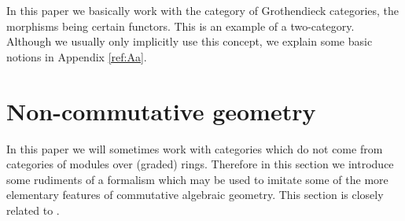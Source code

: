 \documentclass{amsproc}
\theoremstyle{definition}
\theoremstyle{remark}
\numberwithin{equation}{section}
\numberwithin{table}{section}
\numberwithin{figure}{section}
\begin{document}
In this paper we basically work with the category of Grothendieck
categories, the morphisms being certain functors. 
This is an example of a
two-category. Although we usually only implicitly use this concept,
we explain some basic notions in Appendix \ref{ref:Aa}.





\section{Non-commutative geometry}
\label{ref:3a}

In this paper we will sometimes work with categories which do not come
from categories of modules over (graded) rings. Therefore in this
section we introduce some rudiments of a formalism which may be used
to imitate some of the more elementary features of commutative
algebraic geometry. This section is closely related to
\cite{rosenberg}\cite{VdB11}. 
\end{document}
